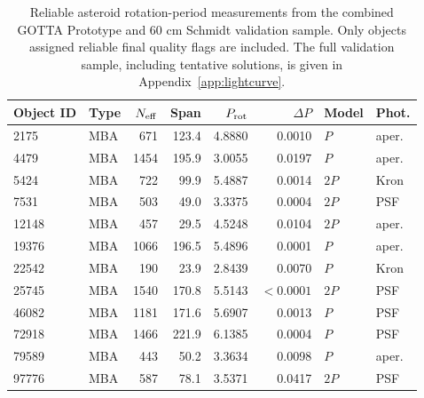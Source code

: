 \begin{table}[!htbp]
\centering
\caption{Reliable asteroid rotation-period measurements from the combined GOTTA Prototype and 60 cm Schmidt validation sample. Only objects assigned reliable final quality flags are included. The full validation sample, including tentative solutions, is given in Appendix~\ref{app:lightcurve}.}
\label{tab:period_reliable_main}
\footnotesize
\setlength{\tabcolsep}{5pt}
\renewcommand{\arraystretch}{1.12}
\begin{tabular}{llrrrrll}
\toprule
Object ID & Type & $N_{\rm eff}$ & Span & $P_{\rm rot}$ & $\Delta P$ & Model & Phot. \\
\midrule
2175 & MBA & 671 & 123.4 & 4.8880 & 0.0010 & $P$ & aper. \\
4479 & MBA & 1454 & 195.9 & 3.0055 & 0.0197 & $P$ & aper. \\
5424 & MBA & 722 & 99.9 & 5.4887 & 0.0014 & $2P$ & Kron \\
7531 & MBA & 503 & 49.0 & 3.3375 & 0.0004 & $2P$ & PSF \\
12148 & MBA & 457 & 29.5 & 4.5248 & 0.0104 & $2P$ & aper. \\
19376 & MBA & 1066 & 196.5 & 5.4896 & 0.0001 & $P$ & aper. \\
22542 & MBA & 190 & 23.9 & 2.8439 & 0.0070 & $P$ & Kron \\
25745 & MBA & 1540 & 170.8 & 5.5143 & $<0.0001$ & $2P$ & PSF \\
46082 & MBA & 1181 & 171.6 & 5.6907 & 0.0013 & $P$ & PSF \\
72918 & MBA & 1466 & 221.9 & 6.1385 & 0.0004 & $P$ & PSF \\
79589 & MBA & 443 & 50.2 & 3.3634 & 0.0098 & $P$ & aper. \\
97776 & MBA & 587 & 78.1 & 3.5371 & 0.0417 & $2P$ & PSF \\
\bottomrule
\end{tabular}
\end{table}
